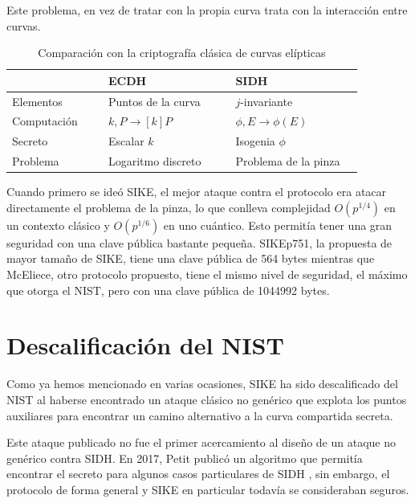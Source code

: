 Este problema, en vez de tratar con la propia curva trata con la interacción entre curvas.

\begin{table}[!ht]
    \centering
    \begin{tabular}{ |p{0.25\linewidth}||p{0.33\linewidth}|p{0.33\linewidth}|}
        \hline
        & ECDH & SIDH \\
        \hline
        Elementos & Puntos de la curva & $j$-invariante \\
        Computación & $k,P \to [k]P$ & $\phi,E \to \phi(E)$ \\
        Secreto & Escalar $k$ & Isogenia $\phi$ \\
        Problema & Logaritmo discreto & Problema de la pinza \\
        \hline
    \end{tabular}
    \caption{Comparación con la criptografía clásica de curvas elípticas}
    \label{tab:ecdh-vs-sidh}
    \cite{sidh-sike}
\end{table}

Cuando primero se ideó SIKE, el mejor ataque contra el protocolo era atacar directamente el problema de la pinza, lo que conlleva complejidad $O(p^{1/4})$ en un contexto clásico y $O(p^{1/6})$ en uno cuántico. Esto permitía tener una gran seguridad con una clave pública bastante pequeña. SIKEp751, la propuesta de mayor tamaño de SIKE, tiene una clave pública de 564 bytes mientras que McEliece, otro protocolo propuesto, tiene el mismo nivel de seguridad, el máximo que otorga el NIST, pero con una clave pública de 1044992 bytes. 

%
%

\section{Descalificación del NIST}\label{sec:estudioteorico:descalificacion}

Como ya hemos mencionado en varias ocasiones, SIKE ha sido descalificado del NIST al haberse encontrado un ataque clásico no genérico que explota los puntos auxiliares para encontrar un camino alternativo a la curva compartida secreta.

Este ataque publicado no fue el primer acercamiento al diseño de un ataque no genérico contra SIDH. En 2017, Petit publicó un algoritmo que permitía encontrar el secreto para algunos casos particulares de SIDH \cite{petit}, sin embargo, el protocolo de forma general y SIKE en particular todavía se consideraban seguros.

